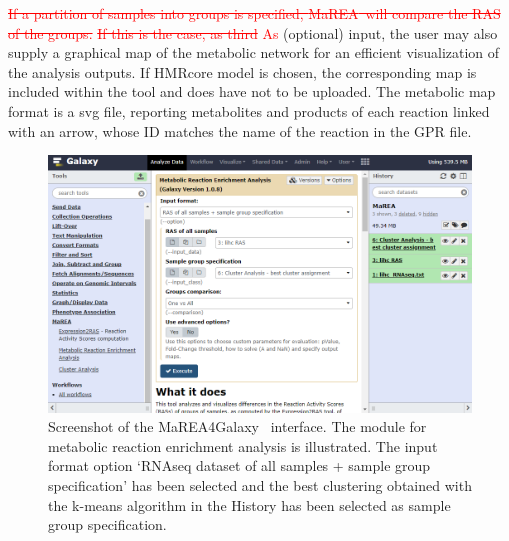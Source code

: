 \documentclass[preprint,12pt,authoryear]{elsarticle}
\newcommand{\red}{\textcolor{red}}
\newcommand{\mareagalaxy}{\textsf{MaREA4Galaxy}}
\newcommand{\mareaTool}{\textsf{MaREA}}
\begin{document}
\red{\sout{If a partition of samples into groups is specified,
\mareaTool\ will compare the RAS of the  groups.}} \red{\sout{If this is the case, as third} As} (optional) input, the user may also supply a graphical map of the metabolic network for an efficient visualization of the analysis outputs. If HMRcore model is chosen, the corresponding map is included within the tool and does have not to be uploaded. The metabolic map format is a svg file, reporting metabolites and products of each reaction linked with an arrow, whose ID matches the name of the reaction in the GPR file.

\begin{figure}[ht]
    \includegraphics[width=1\textwidth]{figs/screenshot3v2q.png}
	\caption{Screenshot of the \mareagalaxy~ interface. The module for metabolic reaction enrichment analysis is illustrated. The input format option `RNAseq dataset of all samples + sample group specification' has been selected and the best clustering obtained with the k-means algorithm in the History has been selected as sample group specification.}
	\label{fig:screenshot3}
\end{figure}
\end{document}
